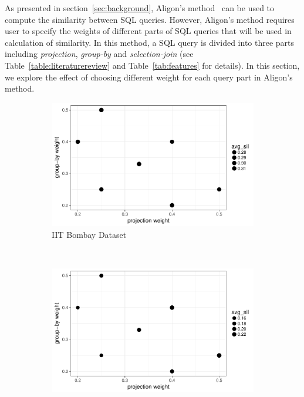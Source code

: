 As presented in section~\ref{sec:background}, Aligon's method~\cite{aligon2014similarity} can be used to compute the similarity between SQL queries. However, Aligon's method requires user to specify the weights of different parts of SQL queries that will be used in calculation of similarity. In this method, a SQL query is divided into three parts including \textit{projection}, \textit{group-by} and \textit{selection-join} (see Table~\ref{table:literaturereview} and Table~\ref{tab:features} for details). In this section, we explore the effect of choosing different weight for each query part in Aligon's method. 

\begin{figure}[h!]
	\captionsetup[subfigure]{justification=centering}
    \centering
    \begin{subfigure}[b]{0.322\textwidth}%
        \centering
        \includegraphics[width=\textwidth]{graphics/aligon_weight_bombay}
        \caption{IIT Bombay Dataset}
    \end{subfigure}%
    ~
    \begin{subfigure}[b]{0.322\textwidth}%
        \centering
        \includegraphics[width=\textwidth]{graphics/aligon_weight_ub}

\end{subfigure}
\end{figure}
